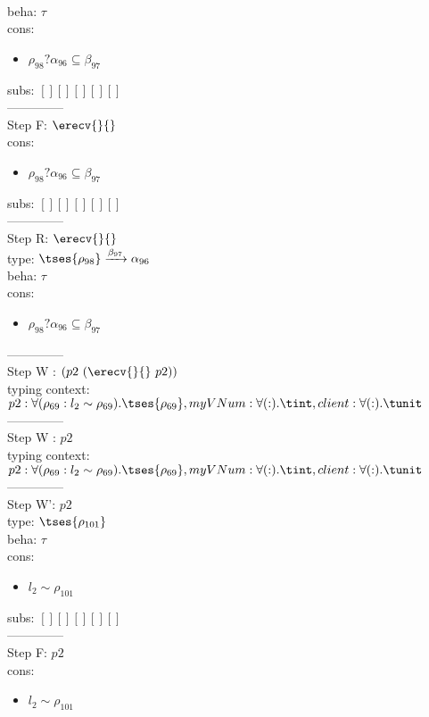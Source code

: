 \documentclass[12pt]{article}
\begin{document}
\\  beha: $ \tau $ 
\\  cons: \begin{itemize}
\item $ \rho_{98}?\alpha_{96} \subseteq \beta_{97} $
\end{itemize} 
  subs:  $ [ ] [] [] [] [] $  
 \\--------------\\ 
Step F: $ \erecv{}{} $
 \\ cons: \begin{itemize}
\item $ \rho_{98}?\alpha_{96} \subseteq \beta_{97} $
\end{itemize}
 subs:  $ [ ] [] [] [] [] $ 
  \\--------------\\ 
Step R: $ \erecv{}{} $\\
  type: $  \tses{ \rho_{98}} \xrightarrow{\beta_{97}} \alpha_{96} $ 
\\  beha: $ \tau $ 
\\  cons: \begin{itemize}
\item $ \rho_{98}?\alpha_{96} \subseteq \beta_{97} $
\end{itemize} 
  --------------\\ 
Step W : $ (p2~(\erecv{}{}~p2)) $\\
 typing context: $ p2:\forall (\rho_{69} : l_{2} \sim\rho_{69}).  \tses{ \rho_{69}}, myVNum:\forall ( : ). \tint, client:\forall ( : ). \tunit$ 
\\ --------------\\
Step W : $ p2 $\\
 typing context: $ p2:\forall (\rho_{69} : l_{2} \sim\rho_{69}).  \tses{ \rho_{69}}, myVNum:\forall ( : ). \tint, client:\forall ( : ). \tunit$ 
\\ --------------\\
Step W': $ p2 $\\
  type: $  \tses{ \rho_{101}} $ 
\\  beha: $ \tau $ 
\\  cons: \begin{itemize}
\item $ l_{2} \sim\rho_{101} $
\end{itemize} 
  subs:  $ [ ] [] [] [] [] $  
 \\--------------\\ 
Step F: $ p2 $
 \\ cons: \begin{itemize}
\item $ l_{2} \sim\rho_{101} $
\end{itemize}
\end{document}

